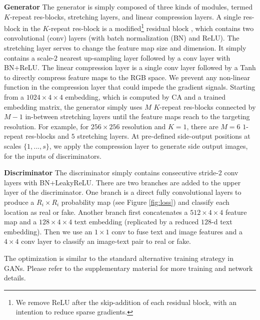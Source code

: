 \documentclass[10pt,twocolumn,letterpaper]{article}
\begin{document}
\textbf{Generator} The generator is simply composed of three kinds of modules, termed $K$-repeat res-blocks, stretching layers, and linear compression layers.
A single res-block in the $K$-repeat res-block is a modified\footnote{We remove ReLU after the skip-addition of each residual block, with an intention to reduce sparse gradients.} residual block \cite{he2016identity}, which contains two convolutional (conv) layers (with batch normalization (BN) \cite{ioffe2015batch} and ReLU). The stretching layer serves to change the feature map size and dimension. It simply contains a scale-$2$ nearest up-sampling layer followed by a conv layer with BN+ReLU. The linear compression layer is a single conv layer followed by a Tanh to directly compress feature maps to the RGB space. We prevent any non-linear function in the compression layer that could impede the gradient signals. 
Starting from a $1024{\times}4{\times}4$ embedding, which is computed by CA and a trained embedding matrix, the generator simply uses $M$ $K$-repeat res-blocks connected by $M{-}1$ in-between stretching layers until the feature maps reach to the targeting resolution. 
For example, for $256{\times}256$ resolution and $K{=}1$, there are $M{=}6$ $1$-repeat res-blocks and $5$ stretching layers. 
At pre-defined side-output positions at scales $\{1,...,s\}$, we apply the compression layer to generate side output images, for the inputs of discriminators. 

\textbf{Discriminator} The discriminator simply contains consecutive stride-2 conv layers with BN+LeakyReLU. There are two branches are added to the upper layer of the discriminator. One branch is a direct fully convolutional layers to produce a $R_i{\times}R_i$ probability map (see Figure \ref{fig:loss}) and classify each location as real or fake. 
Another branch first concatenates a $512{\times}4{\times}4$ feature map and a $128{\times}4{\times}4$ text embedding (replicated by a reduced $128$-d text embedding). Then we use an $1{\times}1$ conv to fuse text and image features and a $4{\times}4$ conv layer to classify an image-text pair to real or fake.

The optimization is similar to the standard alternative training strategy in GANs. Please refer to the supplementary material for more training and network details.
\end{document}
